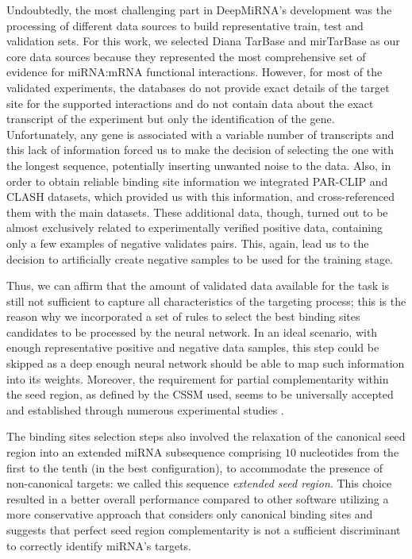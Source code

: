 Undoubtedly, the most challenging part in DeepMiRNA's development was the processing of different data sources to build representative train, test and validation sets. For this work, we selected Diana TarBase and mirTarBase as our core data sources because they represented the most comprehensive set of evidence for miRNA:mRNA functional interactions. However, for most of the validated experiments, the databases do not provide exact details of the target site for the supported interactions and do not contain data about the exact transcript of the experiment but only the identification of the gene. Unfortunately, any gene is associated with a variable number of transcripts and this lack of information forced us to make the decision of selecting the one with the longest sequence, potentially inserting unwanted noise to the data.    Also, in order to obtain reliable binding site information we integrated PAR-CLIP \cite{grosswendt} and CLASH \cite{helwak} datasets, which provided us with this information, and cross-referenced them with the main datasets. These additional data, though, turned out to be almost exclusively related to experimentally verified positive data, containing only a few examples of negative validates pairs. This, again, lead us to the decision to artificially create negative samples to be used for the training stage.  

Thus, we can affirm that the amount of validated data available for the task is still not sufficient to capture all characteristics of the targeting process; this is the reason why we incorporated a set of rules to select the best binding sites candidates to be processed by the neural network. In an ideal scenario, with enough representative positive and negative data samples, this step could be skipped as a deep enough neural network should be able to map such information into its weights. Moreover, the requirement for partial complementarity within the seed region, as defined by the CSSM used, seems to be universally accepted and established through numerous experimental studies \cite{common_features}.

The binding sites selection steps also involved the relaxation of the canonical seed region into an extended miRNA subsequence comprising $10$ nucleotides from the first to the tenth (in the best configuration), to accommodate the presence of non-canonical targets: we called this sequence \emph{extended seed region}. This choice resulted in a better overall performance compared to other software utilizing a more conservative approach that considers only canonical binding sites and suggests that perfect seed region complementarity is not a sufficient discriminant to correctly identify miRNA's targets.

